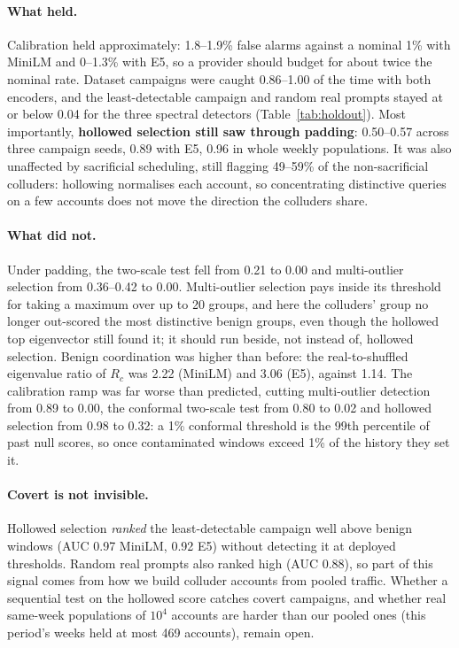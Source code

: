 \paragraph{What held.} Calibration held approximately: 1.8--1.9\% false alarms against a nominal 1\% with MiniLM and 0--1.3\% with E5, so a provider should budget for about twice the nominal rate. Dataset campaigns were caught 0.86--1.00 of the time with both encoders, and the least-detectable campaign and random real prompts stayed at or below 0.04 for the three spectral detectors (Table~\ref{tab:holdout}). Most importantly, \textbf{hollowed selection still saw through padding}: 0.50--0.57 across three campaign seeds, 0.89 with E5, 0.96 in whole weekly populations. It was also unaffected by sacrificial scheduling, still flagging 49--59\% of the non-sacrificial colluders: hollowing normalises each account, so concentrating distinctive queries on a few accounts does not move the direction the colluders share.

\paragraph{What did not.} Under padding, the two-scale test fell from 0.21 to 0.00 and multi-outlier selection from 0.36--0.42 to 0.00. Multi-outlier selection pays inside its threshold for taking a maximum over up to 20 groups, and here the colluders' group no longer out-scored the most distinctive benign groups, even though the hollowed top eigenvector still found it; it should run beside, not instead of, hollowed selection. Benign coordination was higher than before: the real-to-shuffled eigenvalue ratio of $R_c$ was 2.22 (MiniLM) and 3.06 (E5), against 1.14. The calibration ramp was far worse than predicted, cutting multi-outlier detection from 0.89 to 0.00, the conformal two-scale test from 0.80 to 0.02 and hollowed selection from 0.98 to 0.32: a 1\% conformal threshold is the 99th percentile of past null scores, so once contaminated windows exceed 1\% of the history they set it.

\paragraph{Covert is not invisible.} Hollowed selection \emph{ranked} the least-detectable campaign well above benign windows (AUC 0.97 MiniLM, 0.92 E5) without detecting it at deployed thresholds. Random real prompts also ranked high (AUC 0.88), so part of this signal comes from how we build colluder accounts from pooled traffic. Whether a sequential test on the hollowed score catches covert campaigns, and whether real same-week populations of $10^4$ accounts are harder than our pooled ones (this period's weeks held at most 469 accounts), remain open.

